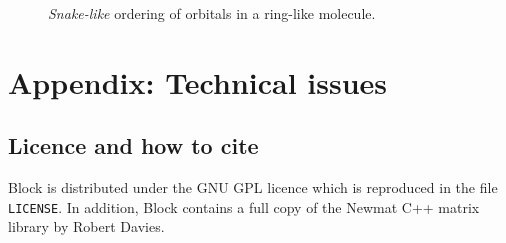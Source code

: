 \documentclass[letterpaper,12pt,aps, pra]{revtex4-1}
\begin{document}
\begin{figure}
 \begin{center}
 \end{center}
 \caption{\emph{Snake-like} ordering of orbitals in a ring-like molecule.}
 \label{fig:order}
 \end{figure}


\section{Appendix: Technical issues}

\subsection{Licence and how to cite}\label{sec:papers}

Block is distributed under the GNU GPL licence which is reproduced in the file \texttt{LICENSE}. In addition, Block contains a 
full copy of the Newmat C++ matrix library by Robert Davies.
\end{document}
